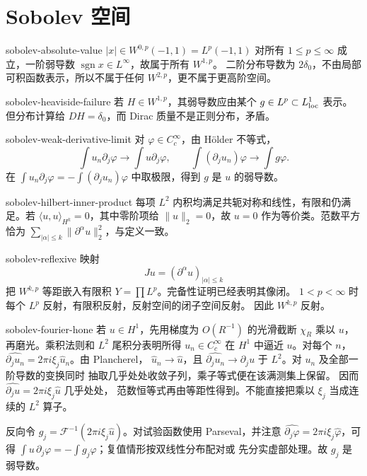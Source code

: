 \chapter{Sobolev 空间}

\begin{solution}{sobolev-absolute-value}
\(|x|\in W^{0,p}(-1,1)=L^p(-1,1)\) 对所有 \(1\le p\le\infty\) 成立，一阶弱导数
\(\operatorname{sgn}x\in L^\infty\)，故属于所有 \(W^{1,p}\)。
二阶分布导数为 \(2\delta_0\)，不由局部可积函数表示，所以不属于任何
\(W^{2,p}\)，更不属于更高阶空间。
\end{solution}

\begin{solution}{sobolev-heaviside-failure}
若 \(H\in W^{1,p}\)，其弱导数应由某个 \(g\in L^p\subset L^1_{\rm loc}\)
表示。但分布计算给 \(DH=\delta_0\)，而 Dirac 质量不是正则分布，矛盾。
\end{solution}

\begin{solution}{sobolev-weak-derivative-limit}
对 \(\varphi\in C_c^\infty\)，由 Hölder 不等式，
\[
 \int u_n\partial_j\varphi\to\int u\partial_j\varphi,\qquad
 \int(\partial_ju_n)\varphi\to\int g\varphi.
\]
在
\(\int u_n\partial_j\varphi=-\int(\partial_ju_n)\varphi\) 中取极限，得到
\(g\) 是 \(u\) 的弱导数。
\end{solution}

\begin{solution}{sobolev-hilbert-inner-product}
每项 \(L^2\) 内积均满足共轭对称和线性，有限和仍满足。若
\(\langle u,u\rangle_{H^k}=0\)，其中零阶项给 \(\|u\|_2=0\)，故 \(u=0\)
作为等价类。范数平方恰为
\(\sum_{|\alpha|\le k}\|\partial^\alpha u\|_2^2\)，与定义一致。
\end{solution}

\begin{solution}{sobolev-reflexive}
映射
\[
 Ju=(\partial^\alpha u)_{|\alpha|\le k}
\]
把 \(W^{k,p}\) 等距嵌入有限积 \(Y=\prod L^p\)。完备性证明已经表明其像闭。
\(1<p<\infty\) 时每个 \(L^p\) 反射，有限积反射，反射空间的闭子空间反射。
因此 \(W^{k,p}\) 反射。
\end{solution}

\begin{solution}{sobolev-fourier-hone}
若 \(u\in H^1\)，先用梯度为 \(O(R^{-1})\) 的光滑截断 \(\chi_R\) 乘以
\(u\)，再磨光。乘积法则和 \(L^2\) 尾积分表明所得
\(u_n\in C_c^\infty\) 在 \(H^1\) 中逼近 \(u\)。对每个 \(n\)，
\(\widehat{\partial_ju_n}=2\pi i\xi_j\widehat u_n\)。由 Plancherel，
\(\widehat u_n\to\widehat u\)，且 \(\widehat{\partial_ju_n}\to
\widehat{\partial_ju}\) 于 \(L^2\)。对 \(u_n\) 及全部一阶导数的变换同时
抽取几乎处处收敛子列，乘子等式便在该满测集上保留。
因而 \(\widehat{\partial_ju}=2\pi i\xi_j\widehat u\) 几乎处处，
范数恒等式再由等距性得到。不能直接把乘以 \(\xi_j\) 当成连续的 \(L^2\) 算子。

反向令 \(g_j=\mathcal F^{-1}(2\pi i\xi_j\widehat u)\)。对试验函数使用
Parseval，并注意
\(\widehat{\partial_j\varphi}=2\pi i\xi_j\widehat\varphi\)，可得
\(\int u\,\partial_j\varphi=-\int g_j\varphi\)；复值情形按双线性分布配对或
先分实虚部处理。故 \(g_j\) 是弱导数。
\end{solution}

